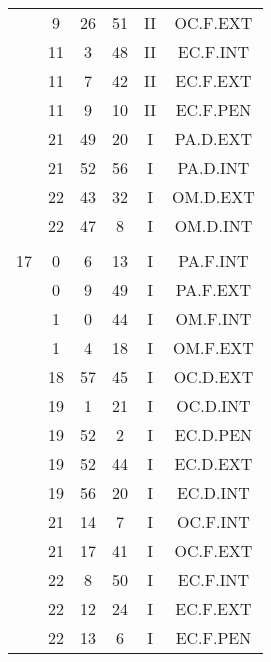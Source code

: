 \documentclass[12pt, a4paper]{article}
\begin{document}
\begin{multicols}{3}
{\begin{tabular}{c c c c c c}
	 	 	 	 & 9 & 26 & 51 & II & OC.F.EXT\\%
	 	 	 	 & 11 & 3 & 48 & II & EC.F.INT\\%
	 	 	 	 & 11 & 7 & 42 & II & EC.F.EXT\\%
	 	 	 	 & 11 & 9 & 10 & II & EC.F.PEN\\%
	 	 	 	 & 21 & 49 & 20 & I & PA.D.EXT\\%
	 	 	 	 & 21 & 52 & 56 & I & PA.D.INT\\%
	 	 	 	 & 22 & 43 & 32 & I & OM.D.EXT\\%
	 	 	 	 & 22 & 47 & 8 & I & OM.D.INT\\%
	 	 	 	 & & & & & \\%
	 	 	 	17 & 0 & 6 & 13 & I & PA.F.INT\\%
	 	 	 	 & 0 & 9 & 49 & I & PA.F.EXT\\%
	 	 	 	 & 1 & 0 & 44 & I & OM.F.INT\\%
	 	 	 	 & 1 & 4 & 18 & I & OM.F.EXT\\%
	 	 	 	 & 18 & 57 & 45 & I & OC.D.EXT\\%
	 	 	 	 & 19 & 1 & 21 & I & OC.D.INT\\%
	 	 	 	 & 19 & 52 & 2 & I & EC.D.PEN\\%
	 	 	 	 & 19 & 52 & 44 & I & EC.D.EXT\\%
	 	 	 	 & 19 & 56 & 20 & I & EC.D.INT\\%
	 	 	 	 & 21 & 14 & 7 & I & OC.F.INT\\%
	 	 	 	 & 21 & 17 & 41 & I & OC.F.EXT\\%
	 	 	 	 & 22 & 8 & 50 & I & EC.F.INT\\%
	 	 	 	 & 22 & 12 & 24 & I & EC.F.EXT\\%
	 	 	 	 & 22 & 13 & 6 & I & EC.F.PEN\\%

\end{tabular}}
\end{multicols}
\end{document}
